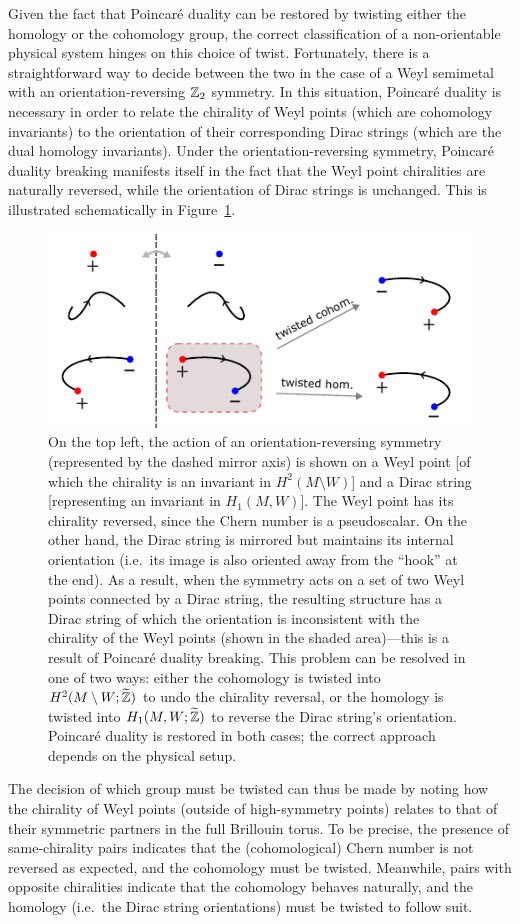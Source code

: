 Given the fact that Poincaré duality can be restored by twisting either the homology or the cohomology group, the correct classification of a non-orientable physical system hinges on this choice of twist. Fortunately, there is a straightforward way to decide between the two in the case of a Weyl semimetal with an orientation-reversing $\mathbb{Z}_2$ symmetry. In this situation, Poincaré duality is necessary in order to relate the chirality of Weyl points (which are cohomology invariants) to the orientation of their corresponding Dirac strings (which are the dual homology invariants). Under the orientation-reversing symmetry, Poincaré duality breaking manifests itself in the fact that the Weyl point chiralities are naturally reversed, while the orientation of Dirac strings is unchanged. This is illustrated schematically in Figure~\ref{fig:local_coefficients}.
\begin{figure}[htb!]
	\centering
	\includegraphics[width=.9\linewidth]{Images/local_coefficients}
	\caption{On the top left, the action of an orientation-reversing symmetry (represented by the dashed mirror axis) is shown on a Weyl point [of which the chirality is an invariant in $H^2(M\setminus W)$] and a Dirac string  [representing an invariant in $H_1(M,W)$]. The Weyl point has its chirality reversed, since the Chern number is a pseudoscalar. On the other hand, the Dirac string is mirrored but maintains its internal orientation (i.e.\ its image is also oriented away from the ``hook'' at the end). As a result, when the symmetry acts on a set of two Weyl points connected by a Dirac string, the resulting structure has a Dirac string of which the orientation is inconsistent with the chirality of the Weyl points (shown in the shaded area)---this is a result of Poincaré duality breaking. This problem can be resolved in one of two ways: either the cohomology is twisted into $H^2(M\setminus W;\widetilde{\mathbb{Z}})$ to undo the chirality reversal, or the homology is twisted into $H_1(M,W;\widetilde{\mathbb{Z}})$ to reverse the Dirac string's orientation. Poincaré duality is restored in both cases; the correct approach depends on the physical setup.}
	\label{fig:local_coefficients}
\end{figure}
The decision of which group must be twisted can thus be made by noting how the chirality of Weyl points (outside of high-symmetry points) relates to that of their symmetric partners in the full Brillouin torus. To be precise, the presence of same-chirality pairs indicates that the (cohomological) Chern number is not reversed as expected, and the cohomology must be twisted. Meanwhile, pairs with opposite chiralities indicate that the cohomology behaves naturally, and the homology (i.e.\ the Dirac string orientations) must be twisted to follow suit.

